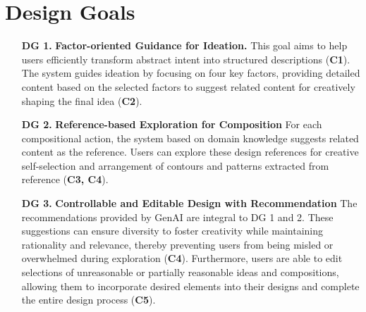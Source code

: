 \section{Design Goals}
\begin{itemize}
    \item[\textbf{DG 1.}] \textbf{Factor-oriented Guidance for Ideation.} This goal aims to help users efficiently transform abstract intent into structured descriptions (\textbf{C1}). The system guides ideation by focusing on four key factors, providing detailed content based on the selected factors to suggest related content for creatively shaping the final idea (\textbf{C2}).

    \item[\textbf{DG 2.}] \textbf{Reference-based Exploration for Composition} For each compositional action, the system based on domain knowledge suggests related content as the reference. Users can explore these design references for creative self-selection and arrangement of contours and patterns extracted from reference (\textbf{C3, C4}).

    \item[\textbf{DG 3.}] \textbf{Controllable and Editable Design with Recommendation} The recommendations provided by GenAI are integral to DG 1 and 2. These suggestions can ensure diversity to foster creativity while maintaining rationality and relevance, thereby preventing users from being misled or overwhelmed during exploration (\textbf{C4}). Furthermore, users are able to edit selections of unreasonable or partially reasonable ideas and compositions, allowing them to incorporate desired elements into their designs and complete the entire design process (\textbf{C5}).
    
    
    
\end{itemize}

